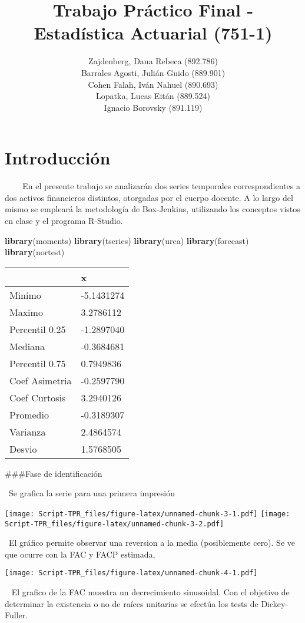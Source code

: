 \documentclass[]{article}
\title{Trabajo Práctico Final - Estadística Actuarial (751-1)}
\author{Zajdenberg, Dana Rebeca (892.786) \\ Barrales Agosti, Julián Guido (889.901) \\ Cohen Falah, Iván Nahuel (890.693) \\ Lopatka, Lucas Eitán (889.524) \\ Ignacio Borovsky (891.119)}
\date{}
\newenvironment{Shaded}{\begin{snugshade}}{\end{snugshade}}
\newcommand{\KeywordTok}[1]{\textcolor[rgb]{0.13,0.29,0.53}{\textbf{#1}}}
\newcommand{\NormalTok}[1]{#1}
\begin{document}
\maketitle

\hypertarget{introduccion}{%
\section{Introducción}\label{introduccion}}

~ ~ ~En el presente trabajo se analizarán dos series temporales
correspondientes a dos activos financieros distintos, otorgadas por el
cuerpo docente. A lo largo del mismo se empleará la metodología de
Box-Jenkins, utilizando los conceptos vistos en clase y el programa
R-Studio.

\begin{Shaded}
\begin{Highlighting}[]
\KeywordTok{library}\NormalTok{(moments)}
\KeywordTok{library}\NormalTok{(tseries)}
\KeywordTok{library}\NormalTok{(urca)}
\KeywordTok{library}\NormalTok{(forecast)}
\KeywordTok{library}\NormalTok{(nortest)}
\end{Highlighting}
\end{Shaded}

\begin{longtable}[]{@{}ll@{}}
\toprule
& x\tabularnewline
\midrule
\endhead
Minimo & -5.1431274\tabularnewline
Maximo & 3.2786112\tabularnewline
Percentil 0.25 & -1.2897040\tabularnewline
Mediana & -0.3684681\tabularnewline
Percentil 0.75 & 0.7949836\tabularnewline
Coef Asimetria & -0.2597790\tabularnewline
Coef Curtosis & 3.2940126\tabularnewline
Promedio & -0.3189307\tabularnewline
Varianza & 2.4864574\tabularnewline
Desvio & 1.5768505\tabularnewline
\bottomrule
\end{longtable}

\#\#\#Fase de identificación

~Se grafica la serie para una primera impresión

\texttt{[image: Script-TPR\_files/figure-latex/unnamed-chunk-3-1.pdf]}
\texttt{[image: Script-TPR\_files/figure-latex/unnamed-chunk-3-2.pdf]}

~El gráfico permite observar una reversion a la media (posiblemente
cero). Se ve que ocurre con la FAC y FACP estimada,

\texttt{[image: Script-TPR\_files/figure-latex/unnamed-chunk-4-1.pdf]}

~ El grafico de la FAC muestra un decrecimiento sinusoidal. Con el
objetivo de determinar la existencia o no de raíces unitarias se efectúa
los tests de Dickey-Fuller.
\end{document}
